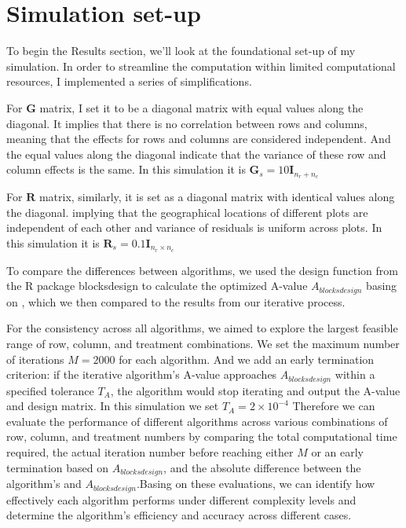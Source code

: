\documentclass[
  a4paper,
  oneside,
  openany,
  12pt,
  onecolumn]{book}
\theoremstyle{definition}
\theoremstyle{definition}
\theoremstyle{plain}
\theoremstyle{remark}
\begin{document}
\section{Simulation set-up}\label{simulation-set-up}

To begin the Results section, we'll look at the foundational set-up of
my simulation. In order to streamline the computation within limited
computational resources, I implemented a series of simplifications.

For \(\boldsymbol{G}\) matrix, I set it to be a diagonal matrix with
equal values along the diagonal. It implies that there is no correlation
between rows and columns, meaning that the effects for rows and columns
are considered independent. And the equal values along the diagonal
indicate that the variance of these row and column effects is the same.
In this simulation it is
\(\boldsymbol{G}_s = 10\boldsymbol{I}_{n_r+n_c}\)

For \(\boldsymbol{R}\) matrix, similarly, it is set as a diagonal matrix
with identical values along the diagonal. implying that the geographical
locations of different plots are independent of each other and variance
of residuals is uniform across plots. In this simulation it is
\(\boldsymbol{R}_s = 0.1\boldsymbol{I}_{n_r\times n_c}\)

To compare the differences between algorithms, we used the design
function from the R package blocksdesign to calculate the optimized
A-value \(A_{blocksdesign}\) basing on \citet{edmondson2020multi}, which
we then compared to the results from our iterative process.

For the consistency across all algorithms, we aimed to explore the
largest feasible range of row, column, and treatment combinations. We
set the maximum number of iterations \(M=2000\) for each algorithm. And
we add an early termination criterion: if the iterative algorithm's
A-value approaches \(A_{blocksdesign}\) within a specified tolerance
\(T_A\), the algorithm would stop iterating and output the A-value and
design matrix. In this simulation we set \(T_A=2\times 10^{-4}\)
Therefore we can evaluate the performance of different algorithms across
various combinations of row, column, and treatment numbers by comparing
the total computational time required, the actual iteration number
before reaching either \(M\) or an early termination based on
\(A_{blocksdesign}\), and the absolute difference between the
algorithm's and \(A_{blocksdesign}\).Basing on these evaluations, we can
identify how effectively each algorithm performs under different
complexity levels and determine the algorithm's efficiency and accuracy
across different cases.
\end{document}

